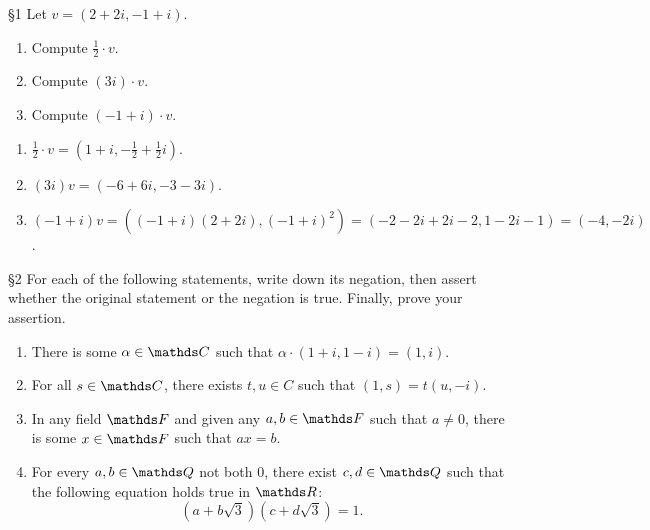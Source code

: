 \documentclass{review-sheet}
\begin{document}
\begin{problem}{\S 1}
  Let $v=\left( 2+2i, -1+i \right) $.
  \begin{enumerate}[label=(\alph*)]
    \item Compute $\frac{1}{2}\cdot v$.
    \item Compute $(3i)\cdot v$.
    \item Compute $(-1+i)\cdot v$.
  \end{enumerate}
\end{problem}

\begin{solution}
  \begin{enumerate}[label=(\alph*)]
    \item $\frac{1}{2}\cdot v = \left( 1+i,-\frac{1}{2}+\frac{1}{2}i \right) $.
    \item $(3i)v = (-6+6i, -3-3i)$.
    \item $(-1+i)v = \left( (-1+i)(2+2i), (-1+i)^2 \right) = (-2-2i+2i-2,1-2i-1)=(-4,-2i)$.
  \end{enumerate}
\end{solution}

\begin{problem}{\S 2}
  For each of the following statements, write down its negation, then assert whether the original
  statement or the negation is true. Finally, prove your assertion.
  \begin{enumerate}[label=(\alph*)]
    \item There is some $ \alpha\in \C$ such that $ \alpha\cdot (1+i,1-i)=(1,i)$.
    \item For all $s \in \C$, there exists $t,u\in C$ such that $(1,s)=t(u,-i)$.
    \item In any field  $\F$ and given any $a,b\in \F$ such that $a\neq 0$, there is some $x\in \F$
      such that $ax=b$.
    \item For every  $a,b\in \Q$ not both $0$, there exist $c,d\in \Q$ such that the following
      equation holds true in $\R$: \[
        \left( a+b\sqrt{3}  \right) \left( c+d\sqrt{3}  \right)  = 1
      .\] 
  \end{enumerate}
\end{problem}
\end{document}
